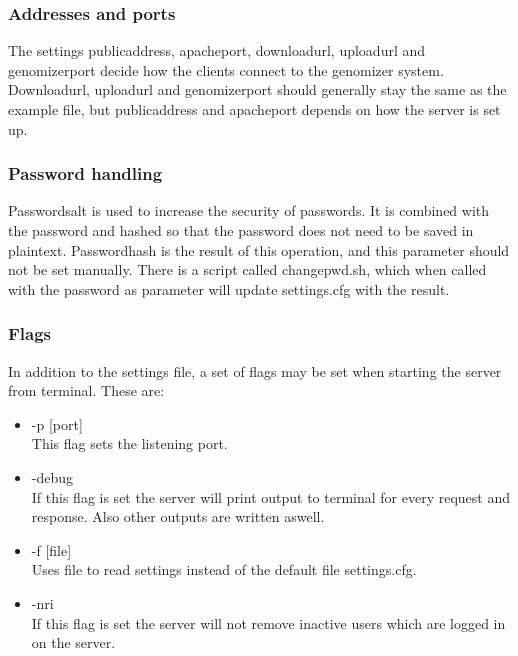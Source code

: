 \subsubsection{Addresses and ports}
The settings publicaddress, apacheport, downloadurl, uploadurl and genomizerport decide how the clients
connect to the genomizer system. Downloadurl, uploadurl and genomizerport should generally stay the same as the example file,
but publicaddress and apacheport depends on how the server is set up.
\subsubsection{Password handling}
Passwordsalt is used to increase the security of passwords. It is combined with the password and hashed so that the password does not need to be
saved in plaintext. Passwordhash is the result of this operation, and this parameter should not be set manually. There is a script called
changepwd.sh, which when called with the password as parameter will update settings.cfg with the result.
\subsubsection{Flags}
In addition to the settings file, a set of flags may be set when starting the server from terminal. These are:
\begin{itemize}
\item -p [port] \\This flag sets the listening port. 
\item -debug \\If this flag is set the server will print output to terminal for every request and response. Also other outputs are written aswell.
\item -f [file] \\Uses file to read settings instead of the default file settings.cfg.
\item -nri \\If this flag is set the server will not remove inactive users which are logged in on the server.
\end{itemize}